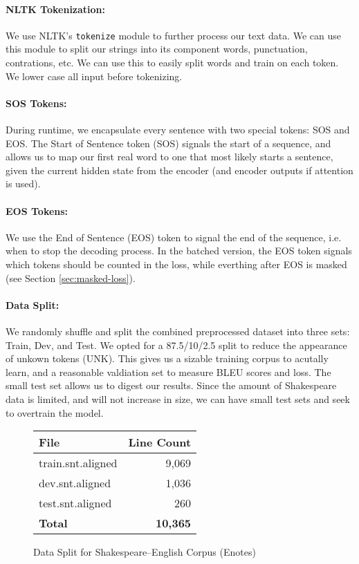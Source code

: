 \documentclass[twoside,twocolumn]{article}
\begin{document}
\paragraph{NLTK Tokenization:}
We use NLTK's \texttt{tokenize} module to further process our text data.
We can use this module to split our strings into its component words,
punctuation, contrations, etc. We can use this to easily split words and train
on each token. We lower case all input before tokenizing.
\paragraph{SOS Tokens:}
During runtime, we encapsulate every sentence with two special tokens:
SOS and EOS. The Start of Sentence token (SOS) signals the start of a
sequence, and allows us to map our first real word to one that most likely
starts a sentence, given the current hidden state from the encoder
(and encoder outputs if attention is used).
\paragraph{EOS Tokens:}
We use the End of Sentence (EOS) token to signal the end of the sequence, i.e.
when to stop the decoding process. In the batched version, the EOS token
signals which tokens should be counted in the loss, while everthing after EOS
is masked (see Section \ref{sec:masked-loss}).
\paragraph{Data Split:}
We randomly shuffle and split the combined preprocessed dataset into three sets:
Train, Dev, and Test. We opted for a 87.5/10/2.5 split to reduce the appearance
of unkown tokens (UNK). This gives us a sizable training corpus to acutally
learn, and a reasonable valdiation set to measure BLEU scores and loss. The
small test set allows us to digest our results. Since the amount of Shakespeare
data is limited, and will not increase in size, we can have small test sets and
seek to overtrain the model.
\begin{figure}[ht]
    \centering
    \begin{tabular}{ |l|r| }
        \hline
        \textbf{File}
          & \textbf{Line Count}\\
        \hline
        train.snt.aligned & 9,069 \\ \hline
        dev.snt.aligned & 1,036 \\ \hline
        test.snt.aligned & 260 \\ \hline
        \textbf{Total} & \textbf{10,365} \\ \hline
    \end{tabular}

    \caption{Data Split for Shakespeare--English Corpus (Enotes)}
    \label{fig:data-lines-enotes}
\end{figure}
\end{document}
